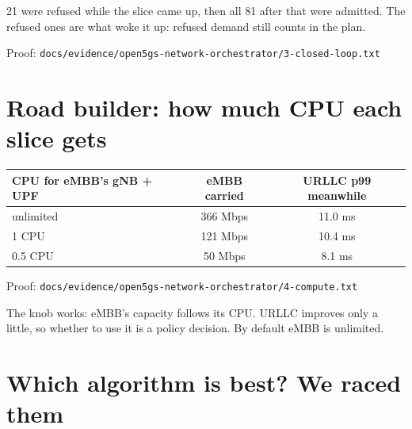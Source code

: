 \documentclass[11pt]{article}
\newcommand{\person}[3][]{%
  \begin{scope}[shift={(#2)},stick,#1]
    \draw (0,1.55) circle (0.22);
    \draw (-0.07,1.6) circle (0.012) (0.07,1.6) circle (0.012);
    \draw (-0.09,1.49) .. controls (-0.03,1.43) and (0.03,1.43) .. (0.09,1.49);
    \draw (0,1.33) -- (0,0.6);
    \draw (0,0.6) -- (-0.25,0) (0,0.6) -- (0.25,0);
    \ifx#3u\draw (0,1.15) -- (-0.35,1.55) (0,1.15) -- (0.35,1.55);\fi
    \ifx#3d\draw (0,1.15) -- (-0.3,0.75) (0,1.15) -- (0.3,0.75);\fi
    \ifx#3p\draw (0,1.15) -- (-0.3,0.75) (0,1.15) -- (0.5,1.2);\fi
    \ifx#3w\draw (0,1.15) -- (-0.3,0.75) (0,1.15) -- (0.3,1.5);\fi
    \ifx#3h\draw (0,1.15) -- (0.35,0.95) -- (0.45,1.05) (0,1.15) -- (-0.3,0.75);\fi
    \ifx#3s\draw (0,1.15) -- (-0.3,1.1) -- (-0.4,1.3) (0,1.15) -- (0.3,1.1) -- (0.4,1.3);\fi
  \end{scope}}
\newcommand{\say}[3][]{\node[draw,rounded corners=4pt,fill=white,font=\footnotesize,align=center,inner sep=3pt,#1] at (#2) {#3};}
\newcommand{\proof}[1]{\par{\footnotesize\color{grey}Proof: \texttt{#1}}\par}
\begin{document}
21 were refused while the slice came up, then all 81 after that were admitted. The refused ones
are what woke it up: refused demand still counts in the plan.
\proof{docs/evidence/open5gs-network-orchestrator/3-closed-loop.txt}

\section{Road builder: how much CPU each slice gets}

\begin{center}
\end{center}

\begin{tabularx}{\linewidth}{@{}Xcc@{}}
\toprule
\textbf{CPU for eMBB's gNB + UPF} & \textbf{eMBB carried} & \textbf{URLLC p99 meanwhile} \\ \midrule
unlimited & 366 Mbps & 11.0 ms \\
1 CPU & 121 Mbps & 10.4 ms \\
0.5 CPU & 50 Mbps & 8.1 ms \\
\bottomrule
\end{tabularx}
\proof{docs/evidence/open5gs-network-orchestrator/4-compute.txt}

The knob works: eMBB's capacity follows its CPU. URLLC improves only a little, so whether to use
it is a policy decision. By default eMBB is unlimited.

\newpage
\section{Which algorithm is best? We raced them}

\begin{center}
\end{center}
\end{document}
